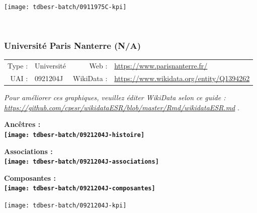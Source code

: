 \documentclass[12pt,french,]{article}
\begin{document}
\begin{center}\texttt{[image: tdbesr-batch/0911975C-kpi]} \end{center}\checkoddpage

\ifoddpage \fi ~\newpage  

\hypertarget{universituxe9-paris-nanterre-na}{%
\subsubsection{Université Paris Nanterre
(N/A)}\label{universituxe9-paris-nanterre-na}}

\begin{tabular*}{\textwidth}{rp{5cm}rl}  
\hline  
Type : & Université & Web : &\href{https://www.parisnanterre.fr/}{https://www.parisnanterre.fr/} \\  
UAI : & 0921204J & WikiData : & \href{https://www.wikidata.org/entity/Q1394262}{https://www.wikidata.org/entity/Q1394262} \\  
\hline  
\end{tabular*}

\textit{\scriptsize Pour améliorer ces graphiques, veuillez éditer WikiData selon ce guide :  \href{https://github.com/cpesr/wikidataESR/blob/master/Rmd/wikidataESR.md}{https://github.com/cpesr/wikidataESR/blob/master/Rmd/wikidataESR.md}}
.

\vspace{1cm}  
\begin{minipage}[b]{0.50\textwidth}\begin{center} \bf Ancêtres : \\  
\texttt{[image: tdbesr-batch/0921204J-histoire]} \end{center}\end{minipage}\begin{minipage}[b]{0.50\textwidth}\begin{center} \bf Associations : \\  
\texttt{[image: tdbesr-batch/0921204J-associations]} \end{center}\end{minipage}

\hrulefill

\begin{center} \bf Composantes : \\  
\texttt{[image: tdbesr-batch/0921204J-composantes]} \end{center}

\begin{center}\texttt{[image: tdbesr-batch/0921204J-kpi]} \end{center}\checkoddpage
\end{document}
